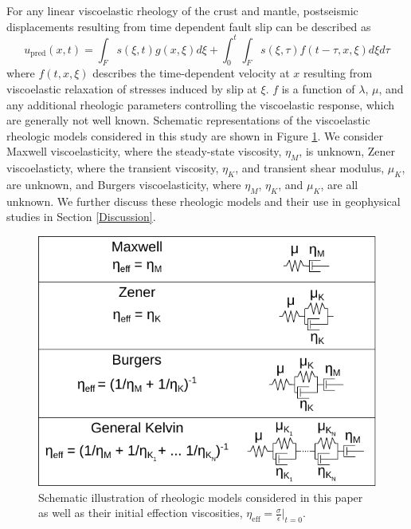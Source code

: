 \documentclass[review]{elsarticle}
\begin{document}
For any linear viscoelastic rheology of the crust and mantle, postseismic displacements resulting from time dependent fault slip can be described as  
\begin{equation}\label{GeneralForward}
  u_\mathrm{pred}(x,t) = \int_F s(\xi,t)g(x,\xi)d\xi + 
           \int_0^t\int_F s(\xi,\tau) f(t-\tau,x,\xi) d\xi d\tau
\end{equation}
where $f(t,x,\xi)$ describes the time-dependent velocity at $x$ resulting from viscoelastic relaxation of stresses induced by slip at $\xi$. $f$ is a function of $\lambda$, $\mu$, and any additional rheologic parameters controlling the viscoelastic response, which are generally not well known. Schematic representations of the viscoelastic rheologic models considered in this study are shown in Figure \ref{fig:Rheology}.  We consider Maxwell viscoelasticity, where the steady-state viscosity, $\eta_M$, is unknown, Zener viscoelasticty, where the transient viscosity, $\eta_K$, and transient shear modulus, $\mu_K$, are unknown, and Burgers viscoelasticity, where $\eta_M$, $\eta_K$, and $\mu_K$, are all unknown. We further discuss these rheologic models and their use in geophysical studies in Section \ref{Discussion}. 

\begin{figure}
\includegraphics[scale=0.7]{Figures/rheology}
\centering 
\caption{Schematic illustration of rheologic models considered in this paper as well as their initial effection viscosities, $\eta_\mathrm{eff}=\frac{\sigma}{\dot\epsilon}|_{t=0}$.}
\label{fig:Rheology}
\end{figure}
\end{document}
